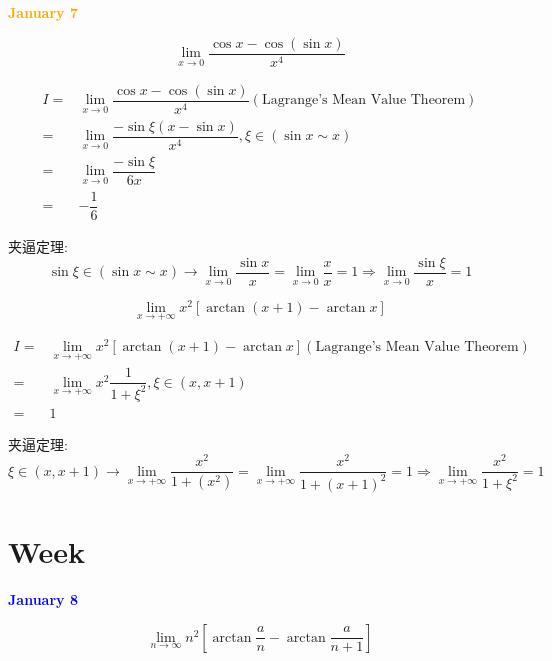 \textcolor{orange}{\textbf{January 7}}

\begin{example}[][Exam: 27.1.18]
	$$\lim\limits_{x\to 0}\dfrac{\cos x-\cos(\sin x)}{x^{4}}$$
\end{example}

\begin{solution}

	\begin{align*}
		I = & \lim\limits_{x\to 0}\dfrac{\cos x-\cos(\sin x)}{x^{4}} (\text{Lagrange's Mean Value Theorem})\\
		  = & \lim\limits_{x\to 0}\dfrac{-\sin \xi(x-\sin x)}{x^{4}}, \xi\in (\sin x\sim x)\\
		  = & \lim\limits_{x\to 0}\dfrac{-\sin \xi}{6x}\\
		  = & -\dfrac{1}{6}
	\end{align*}

	夹逼定理: 
	$$\sin \xi \in (\sin x\sim x)\to \lim\limits_{x\to 0}\dfrac{\sin x}{x} = \lim\limits_{x\to 0}\dfrac{x}{x}=1\Rightarrow \lim\limits_{x\to 0}\dfrac{\sin \xi}{x} = 1$$

\end{solution}

\begin{example}[][Exam: 27.1.19]
	$$\lim\limits_{x\to +\infty}x^{2}\left[\arctan(x+1)-\arctan x\right]$$
\end{example}

\begin{solution}

	\begin{align*}
		I = & \lim\limits_{x\to +\infty}x^{2}[\arctan(x+1)-\arctan x](\text{Lagrange's Mean Value Theorem})\\
		  = & \lim\limits_{x\to +\infty}x^{2}\dfrac{1}{1+\xi^{2}},\xi\in(x,x+1)\\
		  = & 1
	\end{align*}

	夹逼定理: 
	$$\xi\in (x, x+1)\to \lim\limits_{x\to +\infty}\frac{x^{2}}{1+(x^{2})} = \lim\limits_{x\to +\infty}\frac{x^{2}}{1+(x+1)^{2}}=1
	\Rightarrow \lim\limits_{x\to +\infty}\frac{x^{2}}{1+\xi^{2}} = 1$$
\end{solution}


\section{Week }
\textcolor{blue}{\textbf{January 8}}

\begin{example}[][Exam: 27.2.1]
	$$\lim\limits_{n\to \infty}n^{2}\left[\arctan\dfrac{a}{n}-\arctan \dfrac{a}{n+1}\right]$$
\end{example}

